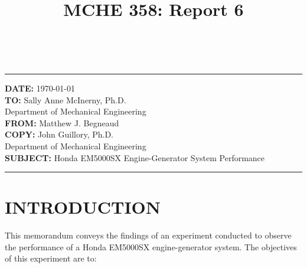 \documentclass[12pt]{article}
\title{MCHE 358: Report 6}
\begin{document}
\fancyhf{}  
  \renewcommand{\headrulewidth}{0pt}
    \pagestyle{plain}
    
\captionsetup[table]{labelsep=space}

\begin{flushleft}
\hrulefill\\\hrule height 1pt
\vspace{5pt}
\textbf{DATE: } \hspace{20pt} \today
\bigskip\\
\textbf{TO: } \hspace{33pt} Sally Anne McInerny, Ph.D.\\ \hspace{60pt} Department of Mechanical Engineering
\bigskip\\
\textbf{FROM: } \hspace{13pt} Matthew J. Begneaud
\bigskip\\
\textbf{COPY: } \hspace{18pt} John Guillory, Ph.D.\\ \hspace{60pt} Department of Mechanical Engineering
\bigskip\\
\textbf{SUBJECT:} \hspace{2pt} Honda EM5000SX Engine-Generator System Performance
\vspace{-10pt}
\end{flushleft}
\hrulefill \hrule height 1pt


\section*{\fontsize{12}{12}\selectfont INTRODUCTION}
This memorandum conveys the findings of an experiment conducted to observe the performance of a Honda EM5000SX engine-generator system. The objectives of this experiment are to:
\end{document}
